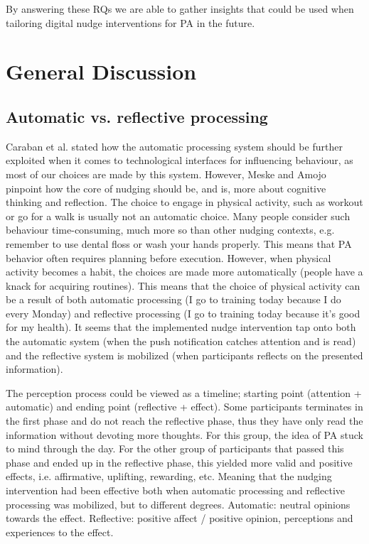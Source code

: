 By answering these RQs we are able to gather insights that could be used when tailoring digital nudge interventions for PA in the future. 

\section{General Discussion}

\subsection{Automatic vs. reflective processing}
Caraban et al. \cite{caraban_23_2019}stated how the automatic processing system should be further exploited when it comes to technological interfaces for influencing behaviour, as most of our choices are made by this system. However, Meske and Amojo \cite{meske_status_2019} pinpoint how the core of nudging should be, and is, more about cognitive thinking and reflection. The choice to engage in physical activity, such as workout or go for a walk is usually not an automatic choice. Many people consider such behaviour time-consuming, much more so than other nudging contexts, e.g. remember to use dental floss or wash your hands properly. This means that PA behavior often requires planning before execution. However, when physical activity becomes a habit, the choices are made more automatically (people have a knack for acquiring routines). This means that the choice of physical activity can be a result of both automatic processing (I go to training today because I do every Monday) and reflective processing (I go to training today because it's good for my health). It seems that the implemented nudge intervention tap onto both the automatic system (when the push notification catches attention and is read) and the reflective system is mobilized (when participants reflects on the presented information). 

The perception process could be viewed as a timeline; starting point (attention + automatic) and ending point (reflective + effect). Some participants terminates in the first phase and do not reach the reflective phase,  thus they have only read the information without devoting more thoughts. For this group, the idea of PA stuck to mind through the day. For the other group of participants that passed this phase and ended up in the reflective phase, this yielded more valid and positive effects, i.e. affirmative, uplifting, rewarding, etc. Meaning that the nudging intervention had been effective both when automatic processing and reflective processing was mobilized, but to different degrees. Automatic: neutral opinions towards the effect. Reflective: positive affect / positive opinion, perceptions and experiences to the effect. 

